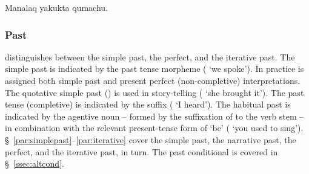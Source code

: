 %
{Manalaq yakukta qumachu.}%
{}%
{}{}%

\subsubsection{Past}\label{ssec:past}
\SYQ{} distinguishes between the simple past, the perfect, and the iterative past. The simple past is indicated by the past tense morpheme  ( `we spoke'). In practice  is assigned both simple past and present perfect (non-completive) interpretations. The quotative simple past () is used in story-telling ( `she brought it'). The past tense (completive) is indicated by the suffix  ( `I heard'). The habitual past is indicated by the agentive noun -- formed by the suffixation of  to the verb stem -- in combination with the relevant present-tense form of  `be' (  `you used to sing'). \S~\ref{par:simplepast}--\ref{par:iterative} cover the simple past, the narrative past, the perfect, and the iterative past, in turn. The past conditional is covered in \S~\ref{ssec:altcond}.

